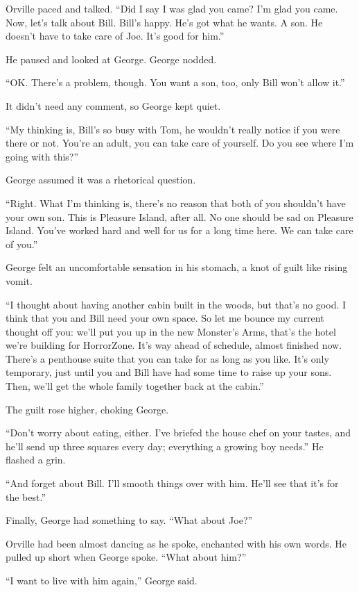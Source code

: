 Orville paced and talked.
``Did I say I was glad you came? I'm glad you came. Now, let's talk about Bill. 
Bill's happy. He's got what he wants. A son. He doesn't have to take care of 
Joe. It's good for him.''

He paused and looked at George. George nodded.

``OK. There's a problem, though. You want a son, too, only Bill won't allow 
it.''

It didn't need any comment, so George kept quiet.

``My thinking is, Bill's so busy with Tom, he wouldn't really notice if you 
were there or not. You're an adult, you can take care of yourself. Do you see 
where I'm going with this?''

George assumed it was a rhetorical question.

``Right. What I'm thinking is, there's no reason that both of you shouldn't 
have your own son. This is Pleasure Island, after all. No one should be sad on 
Pleasure Island. You've worked hard and well for us for a long time here. We 
can take care of you.''

George felt an uncomfortable sensation in his stomach, a knot of
guilt like rising vomit.

``I thought about having another cabin built in the woods, but that's no good. 
I think that you and Bill need your own space. So let me bounce my current 
thought off you: we'll put you up in the new Monster's Arms, that's the hotel 
we're building for HorrorZone. It's way ahead of schedule, almost finished now. 
There's a penthouse suite that you can take for as long as you like. It's only 
temporary, just until you and Bill have had some time to raise up your sons. 
Then, we'll get the whole family together back at the cabin.''

The guilt rose higher, choking George.

``Don't worry about eating, either. I've briefed the house chef on your tastes, 
and he'll send up three squares every day; everything a growing boy needs.''
He flashed a grin.

``And forget about Bill. I'll smooth things over with him. He'll see that it's 
for the best.''

Finally, George had something to say. ``What about Joe?''

Orville had been almost dancing as he spoke, enchanted with his own
words. He pulled up short when George spoke. ``What about him?''

``I want to live with him again,'' George said.

